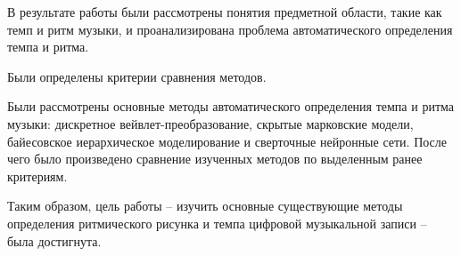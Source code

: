 
В результате работы были рассмотрены понятия предметной области, такие как темп и ритм музыки, и проанализирована проблема автоматического определения темпа и ритма.

Были определены критерии сравнения методов.

Были рассмотрены основные методы автоматического определения темпа и ритма музыки: дискретное вейвлет-преобразование, скрытые марковские модели, байесовское иерархическое моделирование и сверточные нейронные сети. После чего было произведено сравнение изученных методов по выделенным ранее критериям.

Таким образом, цель работы -- изучить основные существующие методы определения ритмического рисунка и темпа цифровой музыкальной записи -- была достигнута.